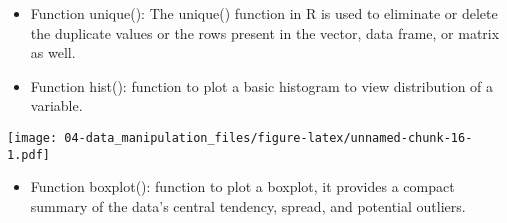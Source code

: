 \documentclass[
]{book}
\newenvironment{Shaded}{\begin{snugshade}}{\end{snugshade}}
\newcommand{\AttributeTok}[1]{\textcolor[rgb]{0.13,0.29,0.53}{#1}}
\newcommand{\CommentTok}[1]{\textcolor[rgb]{0.56,0.35,0.01}{\textit{#1}}}
\newcommand{\FunctionTok}[1]{\textcolor[rgb]{0.13,0.29,0.53}{\textbf{#1}}}
\newcommand{\NormalTok}[1]{#1}
\newcommand{\SpecialCharTok}[1]{\textcolor[rgb]{0.81,0.36,0.00}{\textbf{#1}}}
\newcommand{\StringTok}[1]{\textcolor[rgb]{0.31,0.60,0.02}{#1}}
\providecommand{\tightlist}{%
  \setlength{\itemsep}{0pt}\setlength{\parskip}{0pt}}
\begin{document}
\begin{Shaded}
\end{Shaded}

\begin{itemize}
\tightlist
\item
  Function unique(): The unique() function in R is used to eliminate or delete the duplicate values or the rows present in the vector, data frame, or matrix as well.
\end{itemize}

\begin{Shaded}
\end{Shaded}

\begin{itemize}
\tightlist
\item
  Function hist(): function to plot a basic histogram to view distribution of a variable.
\end{itemize}

\begin{Shaded}
\end{Shaded}

\texttt{[image: 04-data\_manipulation\_files/figure-latex/unnamed-chunk-16-1.pdf]}

\begin{itemize}
\tightlist
\item
  Function boxplot(): function to plot a boxplot, it provides a compact summary of the data's central tendency, spread, and potential outliers.
\end{itemize}
\end{document}
